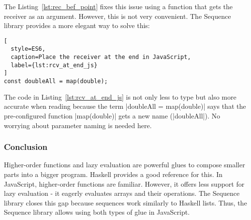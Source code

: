 The Listing~\ref{lst:rec_bef_point} fixes this issue using a function that gets
the receiver as an argument. However, this is not very convenient. The Sequence
library provides a more elegant way to solve this:

\begin{lstlisting}[
  style=ES6,
  caption=Place the receiver at the end in JavaScript,
  label={lst:rcv_at_end_js}
]
const doubleAll = map(double);
\end{lstlisting}

The code in Listing~\ref{lst:rcv_at_end_js} is not only less to type but also
more accurate when reading because the term |doubleAll = map(double)| says that
the pre-configured function |map(double)| gets a new name (|doubleAll|). No worrying about
parameter naming is needed here.

\subsubsection{Conclusion} %
\label{subsub:modularizing_programs_conclusion}
Higher-order functions and lazy evaluation are powerful glues to compose
smaller parts into a bigger program. Haskell provides a good reference for
this. In JavaScript, higher-order functions are familiar. However, it
offers less support for lazy evaluation - it eagerly evaluates arrays and their
operations. The Sequence library closes this gap because sequences work
similarly to Haskell lists. Thus, the Sequence library allows using both types
of glue in JavaScript.

